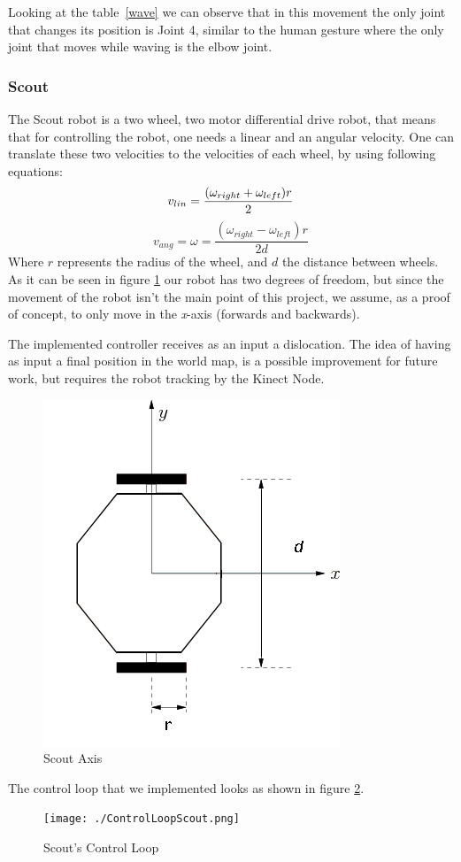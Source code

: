 Looking at the table~\ref{wave} we can observe that in this movement the only joint that changes its position is Joint 4, similar to the human gesture where the only joint that moves while waving is the elbow joint.

\subsubsection{Scout}
The Scout robot is a two wheel, two motor differential drive robot, that means that for controlling the robot, one needs a linear and an angular velocity. One can translate these two velocities to the velocities of each wheel, by using following equations:
\begin{equation}
v_{lin} = \frac{(\omega_{right}+\omega_{left})r}{2} \\
\end{equation}
\begin{equation}
v_{ang} = \omega = \frac{(\omega_{right}-\omega_{left})r}{2d}
\end{equation}
Where $r$ represents the radius of the wheel, and $d$ the distance between wheels.
As it can be seen in figure \ref{fig:scout_axis} our robot has two degrees of freedom, but since the movement of the robot isn't the main point of this project, we assume, as a proof of concept, to only move in the \textit{x}-axis (forwards and backwards).

The implemented controller receives as an input a dislocation. The idea of having as input a final position in the world map, is a possible improvement for future work, but requires the robot tracking by the Kinect Node.

\begin{figure}[!h]
    \centering
    \includegraphics[width=0.5\columnwidth]{./ScoutAxis.png}
    \caption{Scout Axis}
    \label{fig:scout_axis}
\end{figure}
The control loop that we implemented looks as shown in figure \ref{fig:scout_loop}.
\begin{figure}[!h]
    \centering
    \texttt{[image: ./ControlLoopScout.png]}
    \caption{Scout's Control Loop}
    \label{fig:scout_loop}
\end{figure}

